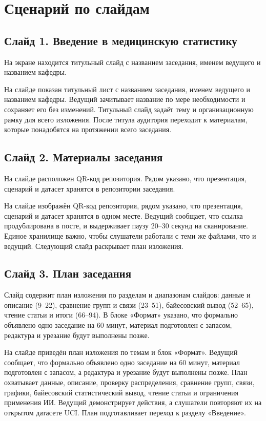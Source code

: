 \documentclass[11pt,a4paper]{article}
\begin{document}
\section*{Сценарий по слайдам}


\subsection*{Слайд 1. Введение в медицинскую статистику}
\begin{onslide}
На экране находится титульный слайд с названием заседания, именем ведущего и названием кафедры.
\end{onslide}
На слайде показан титульный лист с названием заседания, именем ведущего и названием кафедры. Ведущий зачитывает название по мере необходимости и сохраняет его без изменений. Титульный слайд задаёт тему и организационную рамку для всего изложения. После титула аудитория переходит к материалам, которые понадобятся на протяжении всего заседания.

\subsection*{Слайд 2. Материалы заседания}
\begin{onslide}
На слайде расположен QR-код репозитория. Рядом указано, что презентация, сценарий и датасет хранятся в репозитории заседания.
\end{onslide}
На слайде изображён QR-код репозитория, рядом указано, что презентация, сценарий и датасет хранятся в одном месте. Ведущий сообщает, что ссылка продублирована в посте, и выдерживает паузу 20--30 секунд на сканирование. Единое хранилище важно, чтобы слушатели работали с теми же файлами, что и ведущий. Следующий слайд раскрывает план изложения.

\subsection*{Слайд 3. План заседания}
\begin{onslide}
Слайд содержит план изложения по разделам и диапазонам слайдов: данные и описание (9--22), сравнение групп и связи (23--51), байесовский вывод (52--65), чтение статьи и итоги (66--94). В блоке «Формат» указано, что формально объявлено одно заседание на 60 минут, материал подготовлен с запасом, редактура и урезание будут выполнены позже.
\end{onslide}
На слайде приведён план изложения по темам и блок «Формат». Ведущий сообщает, что формально объявлено одно заседание на 60 минут, материал подготовлен с запасом, а редактура и урезание будут выполнены позже. План охватывает данные, описание, проверку распределения, сравнение групп, связи, графики, байесовский статистический вывод, чтение статьи и ограничения применения ИИ. Ведущий демонстрирует действия, а слушатели повторяют их на открытом датасете UCI. План подготавливает переход к разделу «Введение».
\end{document}
